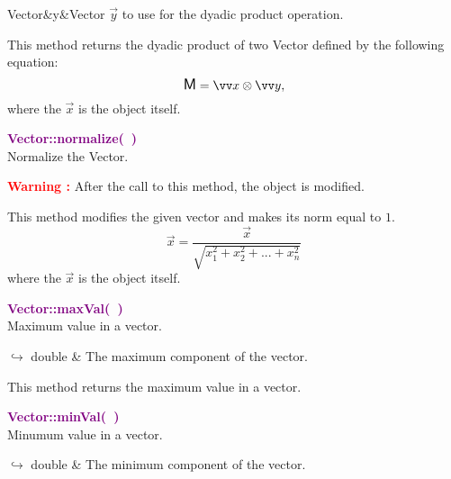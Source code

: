 \begin{tcolorbox}[width=\textwidth,myArgs,tabularx={ll|R}]
Vector&y&Vector $\overrightarrow{y}$ to use for the dyadic product operation.
\end{tcolorbox}

This method returns the dyadic product of two Vector defined by the following equation:
\begin{equation*}
\M = \overrightarrow{x}\otimes\overrightarrow{y},
\end{equation*}
where the $\overrightarrow{x}$ is the object itself.

\textcolor{purple}{\textbf{Vector::normalize(~)}}\label{Vector::normalize()}\\
Normalize the Vector.

\hspace*{10mm}\textcolor{red}{\textbf{Warning :}} After the call to this method, the object is modified.

This method modifies the given vector and makes its norm equal to $1$.
\begin{equation*}
\overrightarrow{x} = \frac{\overrightarrow{x}}{\sqrt {x_{1}^2 + x_{2}^2 + ... + x_{n}^2}}
\end{equation*}
where the $\overrightarrow{x}$ is the object itself.

\textcolor{purple}{\textbf{Vector::maxVal(~)}}\label{Vector::maxVal()}\\
Maximum value in a vector.\vspace*{-0.5em}
\begin{tcolorbox}[grow to left by=-1cm, width=\textwidth-1cm,myArgs,tabularx={l|R}]
$\hookrightarrow$ double & The maximum component of the vector.
\end{tcolorbox}

This method returns the maximum value in a vector.

\textcolor{purple}{\textbf{Vector::minVal(~)}}\label{Vector::minVal()}\\
Minumum value in a vector.\vspace*{-0.5em}
\begin{tcolorbox}[grow to left by=-1cm, width=\textwidth-1cm,myArgs,tabularx={l|R}]
$\hookrightarrow$ double & The minimum component of the vector.
\end{tcolorbox}

